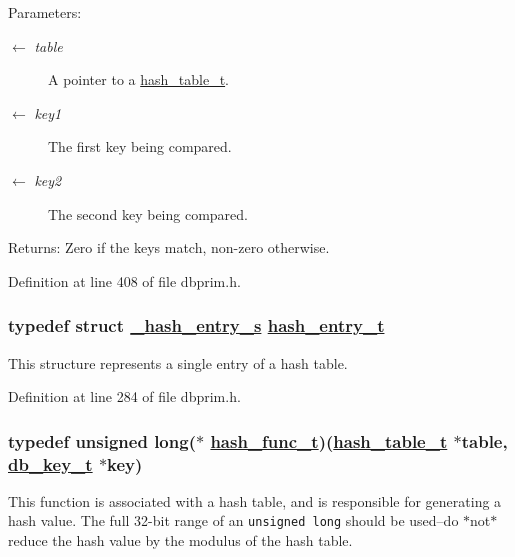 \begin{Desc}
\item[Parameters:]
\begin{description}
\item[\mbox{$\leftarrow$} {\em table}]A pointer to a \hyperlink{group__dbprim__hash_ga1}{hash\_\-table\_\-t}. \item[\mbox{$\leftarrow$} {\em key1}]The first key being compared. \item[\mbox{$\leftarrow$} {\em key2}]The second key being compared.\end{description}
\end{Desc}
\begin{Desc}
\item[Returns:]Zero if the keys match, non-zero otherwise.\end{Desc}


Definition at line 408 of file dbprim.h.\hypertarget{group__dbprim__hash_ga2}{
\subsubsection[hash\_\-entry\_\-t]{\setlength{\rightskip}{0pt plus 5cm}typedef struct \hyperlink{struct__hash__entry__s}{\_\-hash\_\-entry\_\-s} \hyperlink{struct__hash__entry__s}{hash\_\-entry\_\-t}}}
\label{group__dbprim__hash_ga2}


This structure represents a single entry of a hash table.

Definition at line 284 of file dbprim.h.\hypertarget{group__dbprim__hash_ga4}{
\subsubsection[hash\_\-func\_\-t]{\setlength{\rightskip}{0pt plus 5cm}typedef unsigned long($\ast$ \hyperlink{group__dbprim__hash_ga4}{hash\_\-func\_\-t})(\hyperlink{struct__hash__table__s}{hash\_\-table\_\-t} $\ast$table, \hyperlink{struct__db__key__s}{db\_\-key\_\-t} $\ast$key)}}
\label{group__dbprim__hash_ga4}


This function is associated with a hash table, and is responsible for generating a hash value. The full 32-bit range of an {\tt unsigned long} should be used--do $\ast$not$\ast$ reduce the hash value by the modulus of the hash table.

